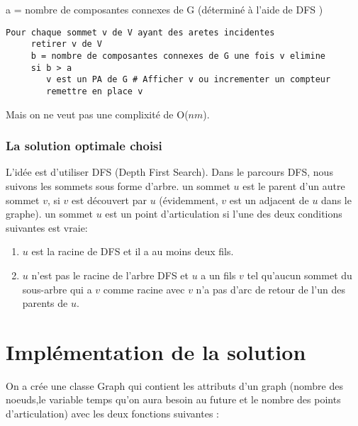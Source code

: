 \documentclass[12pt]{report}
\begin{document}
a = nombre de composantes connexes de G (déterminé à l'aide de DFS )\\
\lstset{language=Python}
\lstset{frame=lines}
\lstset{basicstyle=\footnotesize}
\begin{lstlisting}
Pour chaque sommet v de V ayant des aretes incidentes
	 retirer v de V
	 b = nombre de composantes connexes de G une fois v elimine
	 si b > a
        v est un PA de G # Afficher v ou incrementer un compteur  
        remettre en place v

\end{lstlisting}
Mais on ne veut pas une complixité de O($nm$).
	\subsection{La solution optimale choisi}
L'idée est d'utiliser DFS (Depth First Search). Dans le parcours DFS, nous suivons les sommets sous forme d'arbre. un sommet $u$ est le parent d'un autre sommet $v$, si $v$ est découvert par $u$ (évidemment, $v$ est un adjacent de $u$ dans le graphe). un sommet $u$ est un point d'articulation si l'une des deux conditions suivantes est vraie:
\begin{enumerate}
		\item $u$ est la racine de DFS et il a au moins deux fils.
		\item $u$ n'est pas le racine de l'arbre DFS et $u$ a un fils $v$ tel qu'aucun sommet du sous-arbre qui a $v$ comme racine avec $v$ n'a pas d'arc de retour de l'un des parents de $u$.
\end{enumerate}		

	\chapter{Implémentation de la solution}
	\par{}
On a crée une classe Graph qui contient les attributs d'un graph (nombre des noeuds,le variable temps qu'on aura besoin au future et le nombre des points d'articulation) avec les deux fonctions suivantes :
\end{document}
